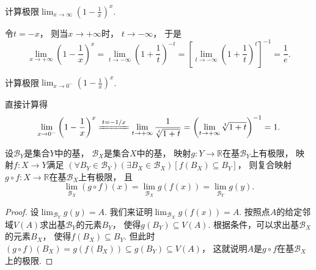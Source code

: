 \begin{example}
计算极限\(\lim_{x \to \infty} \left(1 - \frac1x\right)^x\).
\begin{solution}
令\(t = -x\)，
则当\(x \to +\infty\)时，
\(t \to -\infty\)，
于是\[
	\lim_{x \to +\infty} \left(1 - \frac1x\right)^x
	= \lim_{t \to -\infty} \left(1 + \frac1t\right)^{-t}
	= \left[\lim_{t \to -\infty} \left(1 + \frac1t\right)^t\right]^{-1}
	= \frac1e.
\]
\end{solution}
\end{example}

\begin{example}
计算极限\(\lim_{x\to0^-} \left(1-\frac1x\right)^x\).
\begin{solution}
直接计算得\[
	\lim_{x\to0^-} \left(1-\frac1x\right)^x
	\xlongequal{t=-1/x} \lim_{t\to+\infty} \frac{1}{\sqrt[t]{1+t}}
	= \left(\lim_{t\to+\infty} \sqrt[t]{1+t}\right)^{-1}
	= 1.
\]
\end{solution}
\end{example}

\begin{theorem}
设\(\mathcal{B}_Y\)是集合\(Y\)中的基，
\(\mathcal{B}_X\)是集合\(X\)中的基，
映射\(g\colon Y\to\mathbb{R}\)在基\(\mathcal{B}_Y\)上有极限，
映射\(f\colon X\to Y\)满足
\((\forall B_Y\in\mathcal{B}_Y)
(\exists B_X\in\mathcal{B}_X)
[f(B_X) \subseteq B_Y]\)，
则复合映射\(g \circ f\colon X\to\mathbb{R}\)在基\(\mathcal{B}_X\)上有极限，
且\[
	\lim_{\mathcal{B}_X} (g \circ f)(x)
	= \lim_{\mathcal{B}_X} g(f(x))
	= \lim_{\mathcal{B}_Y} g(y).
\]
\begin{proof}
设\(\lim_{\mathcal{B}_Y} g(y) = A\).
我们来证明\(\lim_{\mathcal{B}_X} g(f(x)) = A\).
按照点\(A\)的给定邻域\(V(A)\)求出基\(\mathcal{B}_Y\)的元素\(B_Y\)，
使得\(g(B_Y) \subseteq V(A)\).
根据条件，可以求出基\(\mathcal{B}_X\)的元素\(B_X\)，
使得\(f(B_X) \subseteq B_Y\).
但此时\((g \circ f)(B_X) = g(f(B_X)) \subseteq g(B_Y) \subseteq V(A)\)，
这就说明\(A\)是\(g \circ f\)在基\(\mathcal{B}_X\)上的极限.
\end{proof}
\end{theorem}
